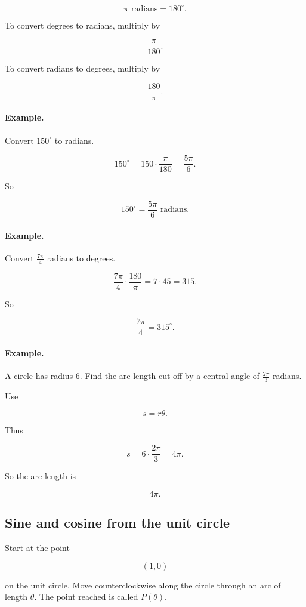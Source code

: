 \[
\boxed{
\pi\text{ radians}=180^\circ.
}
\]

To convert degrees to radians, multiply by

\[
\frac{\pi}{180}.
\]

To convert radians to degrees, multiply by

\[
\frac{180}{\pi}.
\]

\paragraph{Example.}
Convert \(150^\circ\) to radians.

\[
150^\circ
=
150\cdot\frac{\pi}{180}
=
\frac{5\pi}{6}.
\]

So

\[
\boxed{
150^\circ=\frac{5\pi}{6}\text{ radians}.
}
\]

\paragraph{Example.}
Convert \(\frac{7\pi}{4}\) radians to degrees.

\[
\frac{7\pi}{4}\cdot\frac{180}{\pi}
=
7\cdot45
=
315.
\]

So

\[
\boxed{
\frac{7\pi}{4}=315^\circ.
}
\]

\paragraph{Example.}
A circle has radius \(6\).  Find the arc length cut off by a central angle of
\(\frac{2\pi}{3}\) radians.

Use

\[
s=r\theta.
\]

Thus

\[
s=6\cdot\frac{2\pi}{3}=4\pi.
\]

So the arc length is

\[
\boxed{4\pi}.
\]

\subsection{Sine and cosine from the unit circle}
\label{appsubsec:sine-cosine-unit-circle}

Start at the point

\[
(1,0)
\]

on the unit circle.  Move counterclockwise along the circle through an arc of length
\(\theta\).  The point reached is called \(P(\theta)\).

